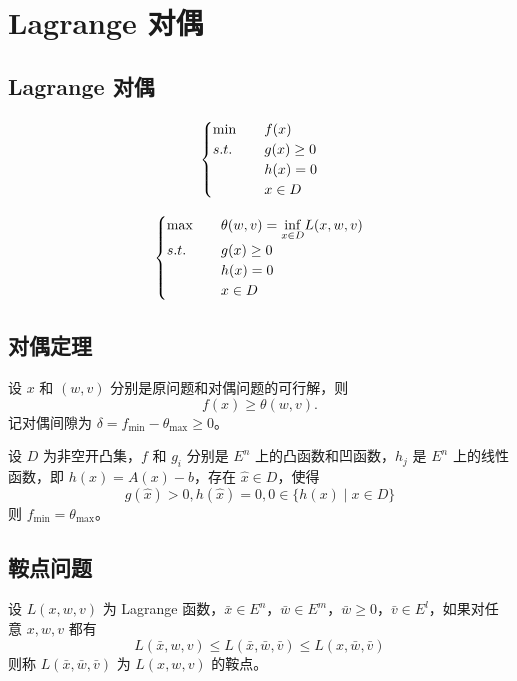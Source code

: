 \section{Lagrange 对偶}

\subsection{Lagrange 对偶}
\begin{minipage}[c]{0.45\linewidth}
    \[
        \begin{cases}
            \min \quad &f(x)\\
            s.t. \quad &g(x) \ge 0\\
            &h(x) = 0\\
            &x \in D
        \end{cases}
    \]
\end{minipage}
\begin{minipage}[c]{0.45\linewidth}
    \[
        \begin{cases}
            \max \quad &\theta(w, v) = \underset{x \in D}{\inf} L(x, w, v)\\
            s.t. \quad &g(x) \ge 0\\
            &h(x) = 0\\
            &x \in D
        \end{cases}
    \]
\end{minipage}
    
\subsection{对偶定理}
\begin{theorem}[弱对偶定理]
    设 $x$ 和 $(w, v)$ 分别是原问题和对偶问题的可行解，则 
    \[
        f(x) \ge \theta(w, v) \text{.}
    \]
    记对偶间隙为 $\delta = f_{\min} - \theta_{\max} \ge 0$。
\end{theorem}

\begin{theorem}[强对偶定理]
    设 $D$ 为非空开凸集，$f$ 和 $g_i$ 分别是 $E^n$ 上的凸函数和凹函数，$h_j$ 是 $E^n$ 上的线性函数，即 $h(x) = A(x) - b$，存在 $\hat{x} \in D$，使得 
    \[
        g(\hat{x}) > 0, h(\hat{x}) = 0, 0 \in \{h(x) \mid x \in D\}    
    \]
    则 $f_{\min} = \theta_{\max}$。
\end{theorem}

\subsection{鞍点问题}
\begin{definition}[鞍点]
    设 $L(x, w, v)$ 为 Lagrange 函数，$\bar{x} \in E^n$，$\bar{w} \in E^m$，$\bar{w} \ge 0$，$\bar{v} \in E^l$，如果对任意 $x, w, v$ 都有 
    \[
        L(\bar{x}, w, v) \le L(\bar{x}, \bar{w}, \bar{v}) \le L(x, \bar{w}, \bar{v})    
    \]
    则称 $L(\bar{x}, \bar{w}, \bar{v})$ 为 $L(x, w, v)$ 的鞍点。
\end{definition}


